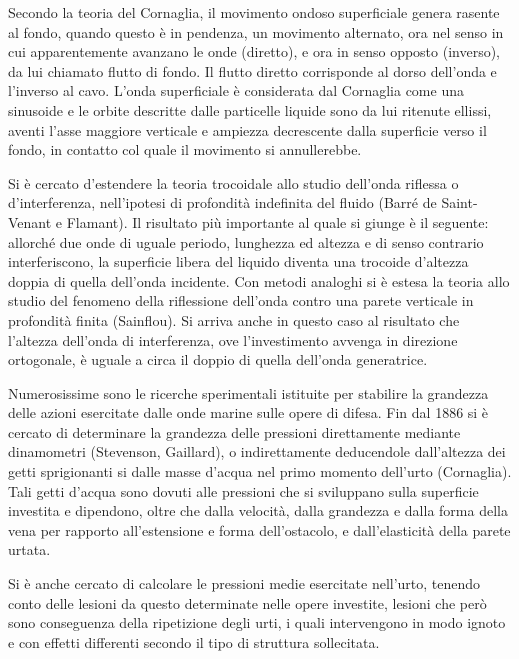 \documentclass[a4paper]{article}
\begin{document}
Secondo la teoria del Cornaglia, il movimento ondoso superficiale genera rasente al fondo, quando questo è in pendenza, un movimento alternato, ora nel senso in cui apparentemente avanzano le onde (diretto), e ora in senso opposto (inverso), da lui chiamato flutto di fondo. Il flutto diretto corrisponde al dorso dell'onda e l'inverso al cavo. L'onda superficiale è considerata dal Cornaglia come una sinusoide e le orbite descritte dalle particelle liquide sono da lui ritenute ellissi, aventi l'asse maggiore verticale e ampiezza decrescente dalla superficie verso il fondo, in contatto col quale il movimento si annullerebbe.

Si è cercato d'estendere la teoria trocoidale allo studio dell'onda riflessa o d'interferenza, nell'ipotesi di profondità indefinita del fluido (Barré de Saint-Venant e Flamant). Il risultato più importante al quale si giunge è il seguente: allorché due onde di uguale periodo, lunghezza ed altezza e di senso contrario interferiscono, la superficie libera del liquido diventa una trocoide d'altezza doppia di quella dell'onda incidente. Con metodi analoghi si è estesa la teoria allo studio del fenomeno della riflessione dell'onda contro una parete verticale in profondità finita (Sainflou). Si arriva anche in questo caso al risultato che l'altezza dell'onda di interferenza, ove l'investimento avvenga in direzione ortogonale, è uguale a circa il doppio di quella dell'onda generatrice.

Numerosissime sono le ricerche sperimentali istituite per stabilire la grandezza delle azioni esercitate dalle onde marine sulle opere di difesa. Fin dal 1886 si è cercato di determinare la grandezza delle pressioni direttamente mediante dinamometri (Stevenson, Gaillard), o indirettamente deducendole dall'altezza dei getti sprigionanti si dalle masse d'acqua nel primo momento dell'urto (Cornaglia). Tali getti d'acqua sono dovuti alle pressioni che si sviluppano sulla superficie investita e dipendono, oltre che dalla velocità, dalla grandezza e dalla forma della vena per rapporto all'estensione e forma dell'ostacolo, e dall'elasticità della parete urtata.

Si è anche cercato di calcolare le pressioni medie esercitate nell'urto, tenendo conto delle lesioni da questo determinate nelle opere investite, lesioni che però sono conseguenza della ripetizione degli urti, i quali intervengono in modo ignoto e con effetti differenti secondo il tipo di struttura sollecitata.
\end{document}
